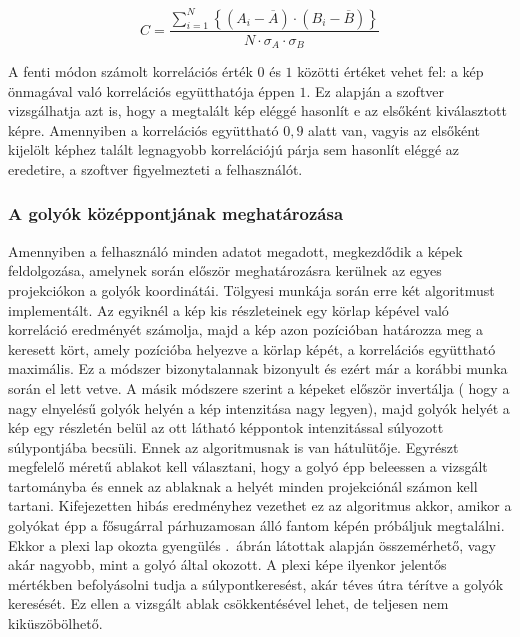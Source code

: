 \documentclass[a4paper,12pt]{article}
\begin{document}
\begin{equation}
\label{eq:corr}
C = \frac{ \sum_{i=1}^{N}  \left \{ (A_i  - \overline{A} ) \cdot ( B_i - \overline{B} ) \right \} }{N \cdot \sigma_A  \cdot \sigma_B}
\end{equation}


A fenti módon számolt korrelációs érték $0$ és $1$ közötti értéket vehet fel: a kép önmagával való korrelációs együtthatója éppen $1$. Ez alapján a szoftver vizsgálhatja azt is, hogy a megtalált kép eléggé hasonlít e az elsőként kiválasztott képre. Amennyiben a korrelációs együttható $0,\!9$ alatt van, vagyis az elsőként kijelölt képhez talált legnagyobb korrelációjú párja sem hasonlít eléggé az eredetire, a szoftver figyelmezteti a felhasználót.



\subsubsection{A golyók középpontjának meghatározása}
\label{sec:kozeppont}



Amennyiben a felhasználó minden adatot megadott, megkezdődik a képek feldolgozása, amelynek során először meghatározásra kerülnek az egyes projekciókon a golyók koordinátái. Tölgyesi \cite{botond} munkája során erre két algoritmust implementált. Az egyiknél a kép kis részleteinek egy körlap képével való korreláció eredményét számolja, majd a kép azon pozícióban határozza meg a keresett kört, amely pozícióba helyezve a körlap képét, a korrelációs együttható maximális.   Ez a módszer bizonytalannak bizonyult és ezért már a korábbi munka során el lett vetve. A másik módszere szerint a képeket először invertálja ( hogy a nagy elnyelésű golyók helyén a kép intenzitása nagy legyen), majd golyók helyét a kép egy részletén belül az ott látható képpontok intenzitással súlyozott súlypontjába becsüli.  Ennek az algoritmusnak is van hátulütője. Egyrészt megfelelő méretű ablakot kell választani, hogy a golyó épp beleessen a vizsgált tartományba és ennek az ablaknak a helyét minden projekciónál számon kell tartani. Kifejezetten hibás eredményhez vezethet ez az algoritmus akkor, amikor a golyókat épp a fősugárral párhuzamosan álló fantom képén próbáljuk megtalálni. Ekkor a plexi lap okozta gyengülés .~ábrán látottak alapján összemérhető, vagy akár nagyobb, mint a golyó által okozott. A plexi képe ilyenkor jelentős mértékben befolyásolni tudja a súlypontkeresést, akár téves útra térítve a golyók keresését. Ez ellen a vizsgált ablak csökkentésével lehet, de teljesen nem kiküszöbölhető.
\end{document}
